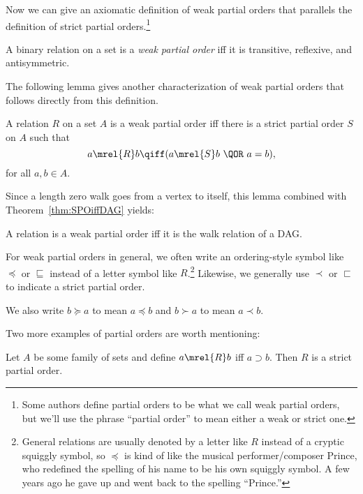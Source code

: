 Now we can give an axiomatic definition of weak partial orders that
parallels the definition of strict partial orders.\footnote{Some
  authors define partial orders to be what we call weak partial
  orders, but we'll use the phrase ``partial order'' to mean either a
  weak or strict one.}

\begin{definition}\label{def:weakPO-axiom}
A binary relation on a set is a \emph{weak partial order} iff it is
transitive, reflexive, and antisymmetric.
\end{definition}

The following lemma gives another characterization of weak partial
orders that follows directly from this definition.
\begin{lemma}
A relation $R$ on a set $A$ is a weak partial order iff
there is a strict partial order $S$ on $A$ such that
\[
a \mrel{R} b \qiff (a \mrel{S} b\ \QOR\ a = b),
\]
for all $a,b \in A$.
\end{lemma}

Since a length zero walk goes from a vertex to itself, this lemma
combined with Theorem~\ref{thm:SPOiffDAG} yields:
\begin{corollary}\label{weakPOiffDAGwalk}
A relation is a weak partial order iff it is the walk relation of a DAG.
\end{corollary}

For weak partial orders in general, we often write an ordering-style
symbol like $\preceq$ or $\sqsubseteq$ instead of a letter symbol like
$R$.\footnote{General relations are usually denoted by a letter like
  $R$ instead of a cryptic squiggly symbol, so $\preceq$ is kind of
  like the musical performer/composer Prince, who redefined the
  spelling of his name to be his own squiggly symbol.  A few years ago
  he gave up and went back to the spelling ``Prince.''}  Likewise, we
generally use $\prec$ or $\sqsubset$ to indicate a strict partial
order.

\begin{editingnotes}

We also write $b \succeq a$ to
mean $a \preceq b$ and $b \succ a$ to mean $a \prec b$.

\end{editingnotes}

Two more examples of partial orders are worth mentioning:

\begin{example}\label{supset}
Let $A$ be some family of sets and define $a \mrel{R} b$ iff $a
\supset b$.  Then $R$ is a strict partial order.
\end{example}

